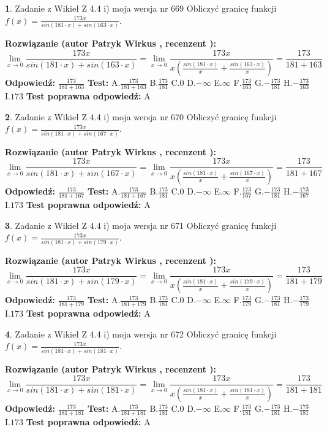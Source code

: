 \documentclass[12pt, a4paper]{article}
\theoremstyle{definition} %
\newtheorem{zad}{}
\newcommand{\zadStart}[1]{\begin{zad}#1\newline}
\newcommand{\zadStop}{\end{zad}}
\newcommand{\rozwStart}[2]{\noindent \textbf{Rozwiązanie (autor #1 , recenzent #2): }\newline}
\newcommand{\rozwStop}{\newline}
\newcommand{\odpStart}{\noindent \textbf{Odpowiedź:}\newline}
\newcommand{\odpStop}{\newline}
\newcommand{\testStart}{\noindent \textbf{Test:}\newline}
\newcommand{\testStop}{\newline}
\newcommand{\kluczStart}{\noindent \textbf{Test poprawna odpowiedź:}\newline}
\newcommand{\kluczStop}{\newline}
\begin{document}
\zadStart{Zadanie z Wikieł Z 4.4 i) moja wersja nr 669}
Obliczyć granicę funkcji $f(x)=\frac{173x}{sin(181\cdot x) +sin(163\cdot x)}$.
\zadStop
\rozwStart{Patryk Wirkus}{}
$$\lim\limits_{x\to 0}\frac{173x}{sin(181\cdot x) +sin(163\cdot x)}=\lim\limits_{x\to 0}\frac{173x}{x(\frac{sin(181\cdot x)}{x}+\frac{sin(163\cdot x)}{x})}=\frac{173}{181+163}$$
\rozwStop
\odpStart
$\frac{173}{181+163}$
\odpStop
\testStart
A.$\frac{173}{181+163}$
B.$\frac{173}{181}$
C.$0$
D.$-\infty$
E.$\infty$
F.$\frac{173}{163}$
G.$-\frac{173}{181}$
H.$-\frac{173}{163}$
I.$173$
\testStop
\kluczStart
A
\kluczStop



\zadStart{Zadanie z Wikieł Z 4.4 i) moja wersja nr 670}
Obliczyć granicę funkcji $f(x)=\frac{173x}{sin(181\cdot x) +sin(167\cdot x)}$.
\zadStop
\rozwStart{Patryk Wirkus}{}
$$\lim\limits_{x\to 0}\frac{173x}{sin(181\cdot x) +sin(167\cdot x)}=\lim\limits_{x\to 0}\frac{173x}{x(\frac{sin(181\cdot x)}{x}+\frac{sin(167\cdot x)}{x})}=\frac{173}{181+167}$$
\rozwStop
\odpStart
$\frac{173}{181+167}$
\odpStop
\testStart
A.$\frac{173}{181+167}$
B.$\frac{173}{181}$
C.$0$
D.$-\infty$
E.$\infty$
F.$\frac{173}{167}$
G.$-\frac{173}{181}$
H.$-\frac{173}{167}$
I.$173$
\testStop
\kluczStart
A
\kluczStop



\zadStart{Zadanie z Wikieł Z 4.4 i) moja wersja nr 671}
Obliczyć granicę funkcji $f(x)=\frac{173x}{sin(181\cdot x) +sin(179\cdot x)}$.
\zadStop
\rozwStart{Patryk Wirkus}{}
$$\lim\limits_{x\to 0}\frac{173x}{sin(181\cdot x) +sin(179\cdot x)}=\lim\limits_{x\to 0}\frac{173x}{x(\frac{sin(181\cdot x)}{x}+\frac{sin(179\cdot x)}{x})}=\frac{173}{181+179}$$
\rozwStop
\odpStart
$\frac{173}{181+179}$
\odpStop
\testStart
A.$\frac{173}{181+179}$
B.$\frac{173}{181}$
C.$0$
D.$-\infty$
E.$\infty$
F.$\frac{173}{179}$
G.$-\frac{173}{181}$
H.$-\frac{173}{179}$
I.$173$
\testStop
\kluczStart
A
\kluczStop



\zadStart{Zadanie z Wikieł Z 4.4 i) moja wersja nr 672}
Obliczyć granicę funkcji $f(x)=\frac{173x}{sin(181\cdot x) +sin(181\cdot x)}$.
\zadStop
\rozwStart{Patryk Wirkus}{}
$$\lim\limits_{x\to 0}\frac{173x}{sin(181\cdot x) +sin(181\cdot x)}=\lim\limits_{x\to 0}\frac{173x}{x(\frac{sin(181\cdot x)}{x}+\frac{sin(181\cdot x)}{x})}=\frac{173}{181+181}$$
\rozwStop
\odpStart
$\frac{173}{181+181}$
\odpStop
\testStart
A.$\frac{173}{181+181}$
B.$\frac{173}{181}$
C.$0$
D.$-\infty$
E.$\infty$
F.$\frac{173}{181}$
G.$-\frac{173}{181}$
H.$-\frac{173}{181}$
I.$173$
\testStop
\kluczStart
A
\kluczStop
\end{document}

